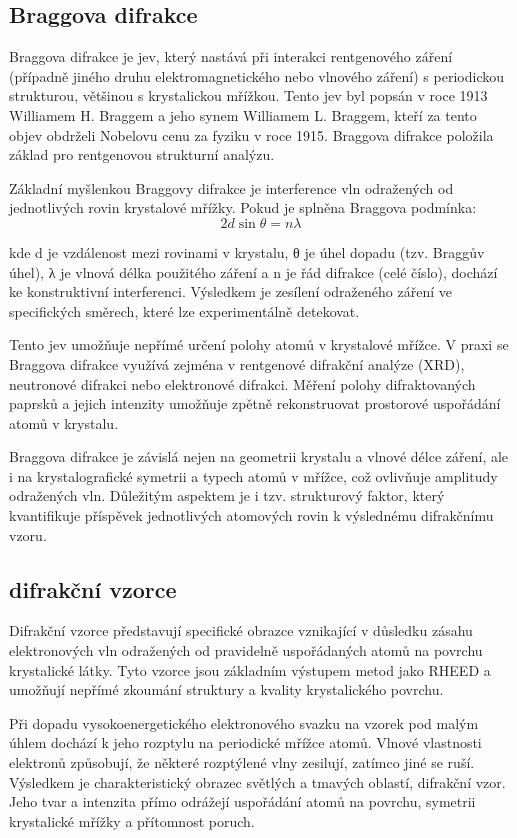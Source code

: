 \documentclass[a4paper,11pt]{article}
\begin{document}
\subsection{Braggova difrakce}
    Braggova difrakce je jev, který nastává při interakci rentgenového záření (případně jiného druhu elektromagnetického nebo vlnového záření) s periodickou strukturou, většinou s krystalickou mřížkou. Tento jev byl popsán v roce 1913 Williamem H. Braggem a jeho synem Williamem L. Braggem, kteří za tento objev obdrželi Nobelovu cenu za fyziku v roce 1915. Braggova difrakce  položila základ pro rentgenovou strukturní analýzu.

Základní myšlenkou Braggovy difrakce je interference vln odražených od jednotlivých rovin krystalové mřížky. Pokud je splněna Braggova podmínka:
\[
2d \sin\theta = n\lambda
\]

kde d je vzdálenost mezi rovinami v krystalu, θ je úhel dopadu (tzv. Braggův úhel), λ je vlnová délka použitého záření a n je řád difrakce (celé číslo), dochází ke konstruktivní interferenci. Výsledkem je zesílení odraženého záření ve specifických směrech, které lze experimentálně detekovat.

Tento jev umožňuje nepřímé určení polohy atomů v krystalové mřížce. V praxi se Braggova difrakce využívá zejména v rentgenové difrakční analýze (XRD), neutronové difrakci nebo elektronové difrakci. Měření polohy difraktovaných paprsků a jejich intenzity umožňuje zpětně rekonstruovat prostorové uspořádání atomů v krystalu.

Braggova difrakce je závislá nejen na geometrii krystalu a vlnové délce záření, ale i na krystalografické symetrii a typech atomů v mřížce, což ovlivňuje amplitudy odražených vln. Důležitým aspektem je i tzv. strukturový faktor, který kvantifikuje příspěvek jednotlivých atomových rovin k výslednému difrakčnímu vzoru.\cite{Bragg}
\newpage


\subsection{difrakční vzorce}
Difrakční vzorce představují specifické obrazce vznikající v důsledku zásahu elektronových vln odražených od pravidelně uspořádaných atomů na povrchu krystalické látky. Tyto vzorce jsou základním výstupem metod jako RHEED a umožňují nepřímé zkoumání struktury a kvality krystalického povrchu.

Při dopadu vysokoenergetického elektronového svazku na vzorek pod malým úhlem dochází k jeho rozptylu na periodické mřížce atomů. Vlnové vlastnosti elektronů způsobují, že některé rozptýlené vlny zesilují, zatímco jiné se ruší. Výsledkem je charakteristický obrazec světlých a tmavých oblastí, difrakční vzor. Jeho tvar a intenzita přímo odrážejí uspořádání atomů na povrchu, symetrii krystalické mřížky a přítomnost poruch.
\end{document}
